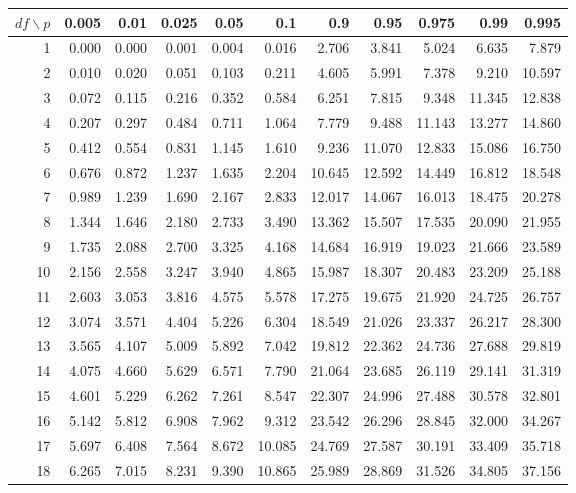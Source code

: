 \begin{tabular}{|r|*{10}{r}|}
\hline
$df\backslash p$ &0.005 & 0.01 & 0.025 & 0.05 & 0.1 & 0.9 & 0.95 &
  0.975 & 0.99 & 0.995 \\
\hline 
1 & 0.000 & 0.000 & 0.001 & 0.004 & 0.016 & 2.706 & 3.841 & 5.024 & 6.635 & 7.879 \\ 
2 &  0.010 &  0.020 &  0.051 &  0.103 &  0.211 &  4.605 &  5.991 &  7.378 &  9.210 & 10.597 \\ 
3 &  0.072 &  0.115 &  0.216 &  0.352 &  0.584 &  6.251 &  7.815 &  9.348 & 11.345 & 12.838 \\ 
4 &  0.207 &  0.297 &  0.484 &  0.711 &  1.064 &  7.779 &  9.488 & 11.143 & 13.277 & 14.860 \\ 
5 &  0.412 &  0.554 &  0.831 &  1.145 &  1.610 &  9.236 & 11.070 & 12.833 & 15.086 & 16.750 \\ 
6 &  0.676 &  0.872 &  1.237 &  1.635 &  2.204 & 10.645 & 12.592 & 14.449 & 16.812 & 18.548 \\ 
7 &  0.989 &  1.239 &  1.690 &  2.167 &  2.833 & 12.017 & 14.067 & 16.013 & 18.475 & 20.278 \\ 
8 &  1.344 &  1.646 &  2.180 &  2.733 &  3.490 & 13.362 & 15.507 & 17.535 & 20.090 & 21.955 \\ 
9 &  1.735 &  2.088 &  2.700 &  3.325 &  4.168 & 14.684 & 16.919 & 19.023 & 21.666 & 23.589 \\ 
10 &  2.156 &  2.558 &  3.247 &  3.940 &  4.865 & 15.987 & 18.307 & 20.483 & 23.209 & 25.188 \\ 
11 &  2.603 &  3.053 &  3.816 &  4.575 &  5.578 & 17.275 & 19.675 & 21.920 & 24.725 & 26.757 \\ 
12 &  3.074 &  3.571 &  4.404 &  5.226 &  6.304 & 18.549 & 21.026 & 23.337 & 26.217 & 28.300 \\ 
13 &  3.565 &  4.107 &  5.009 &  5.892 &  7.042 & 19.812 & 22.362 & 24.736 & 27.688 & 29.819 \\ 
14 &  4.075 &  4.660 &  5.629 &  6.571 &  7.790 & 21.064 & 23.685 & 26.119 & 29.141 & 31.319 \\ 
15 &  4.601 &  5.229 &  6.262 &  7.261 &  8.547 & 22.307 & 24.996 & 27.488 & 30.578 & 32.801 \\ 
16 &  5.142 &  5.812 &  6.908 &  7.962 &  9.312 & 23.542 & 26.296 & 28.845 & 32.000 & 34.267 \\ 
17 &  5.697 &  6.408 &  7.564 &  8.672 & 10.085 & 24.769 & 27.587 & 30.191 & 33.409 & 35.718 \\ 
18 &  6.265 &  7.015 &  8.231 &  9.390 & 10.865 & 25.989 & 28.869 & 31.526 & 34.805 & 37.156 \\ 

\end{tabular}
